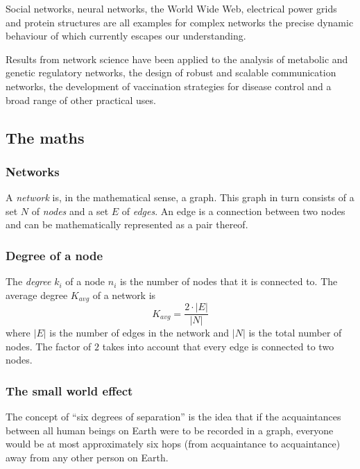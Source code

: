\documentclass[a4paper,11pt,titlepage]{article}
\begin{document}
Social networks, neural networks, the World Wide Web, electrical power grids and
protein structures are all examples for complex networks the precise dynamic
behaviour of which currently escapes our understanding.


Results from network science have been applied to the analysis of metabolic and
genetic regulatory networks, the design of robust and scalable communication
networks, the development of vaccination strategies
for disease control and a broad range of other practical
uses. \cite{complexNets}


\subsection{The maths}


\subsubsection{Networks}

A \emph{network} is, in the mathematical sense, a graph. This
graph in turn consists of a set $N$ of \emph{nodes} and a set
$E$ of \emph{edges}. An edge is a connection between two nodes
and can be mathematically represented as a pair thereof.


\subsubsection{Degree of a node}

The \emph{degree} $k_i$ of a node $n_i$ is the number of nodes that it is
connected to. The average degree $K_{avg}$ of a network is
\[ K_{avg} =\frac{2 \cdot |E|}{|N|} \]
where $|E|$ is the number of edges in the network and $|N|$ is the total
number of nodes. The factor of $2$ takes into account that every edge is
connected to two nodes.

\subsubsection{The small world effect}

The concept of ``six degrees of separation'' is the idea that if the
acquaintances between all human beings on Earth were to be recorded
in a graph, everyone would be at most approximately six hops (from
acquaintance to acquaintance) away from any other person on Earth.
\end{document}
